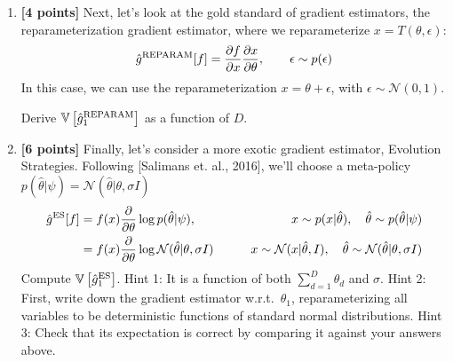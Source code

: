 \documentclass{harvardml}
\newcommand{\distNorm}{\mathcal{N}}
\newcommand{\var}{\mathbb{V}}
\newcommand{\PT}{\frac{\partial}{\partial \theta}}
\theoremstyle{plain}
\begin{document}
\begin{problem}
\begin{enumerate}[label=(\alph*)]
\item {\bf [4 points]} Next, let's look at the gold standard of gradient estimators, the reparameterization gradient estimator, where we reparameterize $x = T(\theta, \epsilon)$:
%
\begin{align}
\hat g^\textnormal{REPARAM}[f] = \frac{\partial f}{\partial x} \frac{\partial x}{\partial \theta}, \qquad \epsilon \sim p(\epsilon)
\end{align}
%
In this case, we can use the reparameterization $x = \theta + \epsilon$, with $\epsilon \sim \distNorm(0, 1)$.

Derive $\var \left[ \hat g^\textnormal{REPARAM}_1 \right]$ as a function of $D$.

\item {\bf [6 points]} Finally, let's consider a more exotic gradient estimator, Evolution Strategies.
Following [Salimans et. al., 2016], we'll choose a meta-policy $p(\hat \theta | \psi) = \distNorm(\hat \theta |  \theta, \sigma I)$
%
\begin{align}
\hat g^\textnormal{ES}[f]
& = f(x) \PT \log p(\hat \theta | \psi), 
& \qquad x \sim p(x | \hat \theta),\quad \hat \theta \sim p(\hat \theta | \psi) \\
& = f(x) \PT \log \distNorm(\hat \theta | \theta, \sigma I)
& \qquad x \sim \distNorm(x | \hat \theta, I), \quad \hat \theta \sim \distNorm(\hat \theta | \theta, \sigma I)
\end{align}
%
Compute $\var \left[ \hat g^\textnormal{ES}_1 \right]$.
Hint 1: It is a function of both $\sum_{d=1}^D \theta_d$ and $\sigma$.
Hint 2: First, write down the gradient estimator w.r.t.\ $\theta_1$, reparameterizing all variables to be deterministic functions of standard normal distributions.
Hint 3: Check that its expectation is correct by comparing it against your answers above.
\end{enumerate}
\end{problem}


\end{document}
